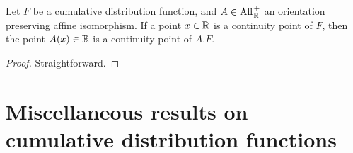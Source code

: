 \begin{lemma}
  \label{lem:cdf-continuity-pt-transform}
  \leanok
  Let $F$ be a cumulative distribution function,
  and $A \in \mathrm{Aff}^+_{\mathbb{R}}$ an orientation preserving affine isomorphism.
  If a point $x \in \mathbb{R}$ is a continuity point of $F$, then
  the point $A(x) \in \mathbb{R}$ is a continuity point of $A.F$.
\end{lemma}
\begin{proof}
  \uses{}
  Straightforward.
\end{proof}


%
%

\section{Miscellaneous results on cumulative distribution functions}

